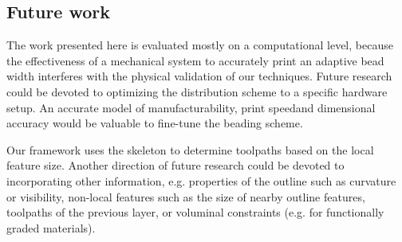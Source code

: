 \subsection{Future work}
The work presented here is evaluated mostly on a computational level, because the effectiveness of a mechanical system to accurately print an adaptive bead width interferes with the physical validation of our techniques.
Future research could be devoted to optimizing the distribution scheme to a specific hardware setup.
An accurate model of manufacturability, print speedand dimensional accuracy would be valuable to fine-tune the beading scheme.

Our framework uses the skeleton to determine toolpaths based on the local feature size.
Another direction of future research could be devoted to incorporating other information, e.g. properties of the outline such as curvature or visibility, non-local features such as the size of nearby outline features, toolpaths of the previous layer, or voluminal constraints (e.g. for functionally graded materials).

